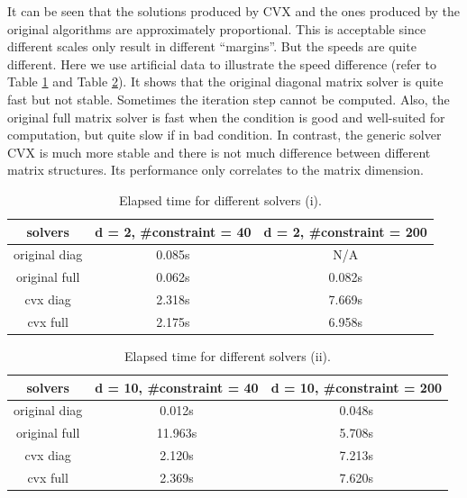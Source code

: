 \documentclass[12pt]{article}
\begin{document}
It can be seen that the solutions produced by CVX and the ones produced by the original algorithms are approximately proportional. This is acceptable since different scales only result in different ``margins''. But the speeds are quite different. Here we use artificial data to illustrate the speed difference (refer to Table \ref{table1} and Table \ref{table2}). It shows that the original diagonal matrix solver is quite fast but not stable. Sometimes the iteration step cannot be computed. Also, the original full matrix solver is fast when the condition is good and well-suited for computation, but quite slow if in bad condition. In contrast, the generic solver CVX is much more stable and there is not much difference between  different matrix structures. Its performance only correlates to the matrix dimension.

\begin{table}[h]
\centering
 \begin{tabular}{ c|c|c }
solvers & d = 2, \#constraint = 40 & d = 2, \#constraint = 200  \\ \hline\hline
original diag & 0.085s  &  N/A\\
original full & 0.062s & 0.082s\\
cvx diag & 2.318s & 7.669s  \\
cvx full  & 2.175s& 6.958s \\
\end{tabular}
\caption{Elapsed time for different solvers (i).}
\label{table1}
\end{table}
\begin{table}[h]
\centering
\begin{tabular}{ c|c|c }
solvers &  d = 10, \#constraint = 40 & d = 10, \#constraint = 200 \\\hline\hline
original diag & 0.012s & 0.048s\\
original full & 11.963s & 5.708s\\
cvx diag & 2.120s & 7.213s \\
cvx full  & 2.369s & 7.620s \\
\end{tabular}
\caption{Elapsed time for different solvers (ii).}
\label{table2}
\end{table}
\end{document}
